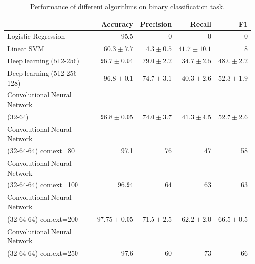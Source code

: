 \documentclass[10pt,journal,compsoc]{IEEEtran}
\begin{document}
\begin{table}[!t]
\caption{Performance of different algorithms on binary classification task.}
\label{tab:performance-binary}
\centering
\begin{tabular}{| l | r | r  | r  | r |}
\hline
 & Accuracy & Precision & Recall & F1 \\
\hline
Logistic Regression & 95.5 & 0 & 0 & 0 \\
\hline
Linear SVM & $60.3 \pm 7.7$ & $4.3 \pm 0.5$ & $41.7 \pm 10.1$ & 8 \\
\hline
Deep learning (512-256) & $96.7 \pm 0.04$ & $79.0 \pm 2.2$ & $34.7 \pm 2.5$ & $48.0 \pm 2.2$ \\
\hline
Deep learning (512-256-128) & $96.8 \pm 0.1$ & $74.7 \pm 3.1$ & $40.3\pm 2.6$ & $52.3 \pm 1.9$ \\
\hline
Convolutional Neural Network & & & & \\
(32-64) & $96.8 \pm 0.05$ & $74.0 \pm 3.7$ & $41.3 \pm 4.5$ & $52.7 \pm 2.6$ \\
\hline
Convolutional Neural Network & & & & \\
(32-64-64) context=80 & 97.1 & 76 & 47 & 58 \\
\hline
Convolutional Neural Network & & & & \\
(32-64-64) context=100 & 96.94 & 64 & 63 & 63 \\
\hline
Convolutional Neural Network & & & & \\
(32-64-64) context=200 & $97.75 \pm 0.05$ & $71.5 \pm 2.5$ & $62.2 \pm 2.0$ & $66.5 \pm 0.5$ \\
\hline
Convolutional Neural Network & & & & \\
(32-64-64) context=250 & 97.6 & 60 & 73 & 66 \\
\hline

\end{tabular}
\end{table}
\end{document}
